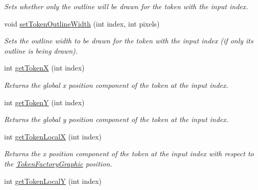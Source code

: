 \begin{DoxyCompactItemize}
\begin{DoxyCompactList}\small\item\em Sets whether only the outline will be drawn for the token with the input index. \end{DoxyCompactList}\item 
\hypertarget{class_picto_1_1_token_factory_graphic_a82eb25ce7940d15e94829648f53c5b61}{void \hyperlink{class_picto_1_1_token_factory_graphic_a82eb25ce7940d15e94829648f53c5b61}{set\-Token\-Outline\-Width} (int index, int pixels)}\label{class_picto_1_1_token_factory_graphic_a82eb25ce7940d15e94829648f53c5b61}

\begin{DoxyCompactList}\small\item\em Sets the outline width to be drawn for the token with the input index (if only its outline is being drawn). \end{DoxyCompactList}\item 
\hypertarget{class_picto_1_1_token_factory_graphic_a5fead22fac76aaa17dd595791b5663e4}{int \hyperlink{class_picto_1_1_token_factory_graphic_a5fead22fac76aaa17dd595791b5663e4}{get\-Token\-X} (int index)}\label{class_picto_1_1_token_factory_graphic_a5fead22fac76aaa17dd595791b5663e4}

\begin{DoxyCompactList}\small\item\em Returns the global x position component of the token at the input index. \end{DoxyCompactList}\item 
\hypertarget{class_picto_1_1_token_factory_graphic_ab46078da1ab92f4d6e19c4f7b3daaaf8}{int \hyperlink{class_picto_1_1_token_factory_graphic_ab46078da1ab92f4d6e19c4f7b3daaaf8}{get\-Token\-Y} (int index)}\label{class_picto_1_1_token_factory_graphic_ab46078da1ab92f4d6e19c4f7b3daaaf8}

\begin{DoxyCompactList}\small\item\em Returns the global y position component of the token at the input index. \end{DoxyCompactList}\item 
\hypertarget{class_picto_1_1_token_factory_graphic_a5b9123bac27de8f668eedec7da13d9c1}{int \hyperlink{class_picto_1_1_token_factory_graphic_a5b9123bac27de8f668eedec7da13d9c1}{get\-Token\-Local\-X} (int index)}\label{class_picto_1_1_token_factory_graphic_a5b9123bac27de8f668eedec7da13d9c1}

\begin{DoxyCompactList}\small\item\em Returns the x position component of the token at the input index with respect to the \hyperlink{class_picto_1_1_token_factory_graphic}{Token\-Factory\-Graphic} position. \end{DoxyCompactList}\item 
\hypertarget{class_picto_1_1_token_factory_graphic_ac694a056bb8d6533cf2682ff66121900}{int \hyperlink{class_picto_1_1_token_factory_graphic_ac694a056bb8d6533cf2682ff66121900}{get\-Token\-Local\-Y} (int index)}\label{class_picto_1_1_token_factory_graphic_ac694a056bb8d6533cf2682ff66121900}


\end{DoxyCompactItemize}

